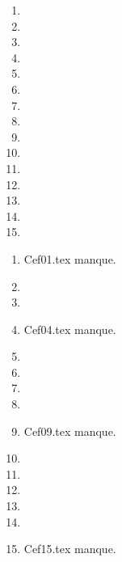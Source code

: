  
 
\begin{enumerate}
  \item  
  \item  
  \item  
  \item  
  \item  
  \item  
  \item  
  \item  
  \item  
  \item  
  \item  
  \item  
  \item  
  \item  
  \item  
\end{enumerate} 
\clearpage 
{}
\begin{enumerate}
  \item Cef01.tex manque. 
  \item  
  \item  
  \item Cef04.tex manque. 
  \item  
  \item  
  \item  
  \item  
  \item Cef09.tex manque. 
  \item  
  \item  
  \item  
  \item  
  \item  
  \item Cef15.tex manque. 
\end{enumerate} 
